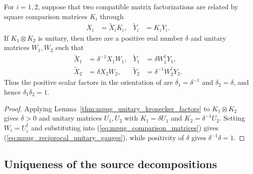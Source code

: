 \begin{lemma}
    \label{thm:mpug_reciprocal_unitary_gauges}
    \leanok
    For $i=1,2$, suppose that two compatible matrix factorizations are related
    by square comparison matrices $K_i$ through
    \begin{align}
        X_i & =\widetilde X_iK_i, & \widetilde Y_i & =K_iY_i.
        \label{eq:mpug_comparison_matrices}
    \end{align}
    If $K_1\otimes K_2$ is unitary, then there are a positive real number
    $\delta$ and unitary matrices $W_1,W_2$ such that
    \begin{align}
        \widetilde X_1 & =\delta^{-1}X_1W_1,          &
        \widetilde Y_1 & =\delta W_1^\dagger Y_1,       \\
        \widetilde X_2 & =\delta X_2W_2,              &
        \widetilde Y_2 & =\delta^{-1}W_2^\dagger Y_2.
        \label{eq:mpug_reciprocal_unitary_gauges}
    \end{align}
    Thus the positive scalar factors in the orientation of
    \cite[Lemma at lines~1052--1066]{FrancoRubio2025MPUGauging} are
    $\delta_1=\delta^{-1}$ and $\delta_2=\delta$, and hence
    $\delta_1\delta_2=1$.
\end{lemma}

\begin{proof}\leanok
    Applying Lemma~\ref{thm:mpug_unitary_kronecker_factors} to
    $K_1\otimes K_2$ gives $\delta>0$ and unitary matrices $U_1,U_2$ with
    $K_1=\delta U_1$ and $K_2=\delta^{-1}U_2$. Setting
    $W_i=U_i^\dagger$ and substituting into
    (\ref{eq:mpug_comparison_matrices}) gives
    (\ref{eq:mpug_reciprocal_unitary_gauges}), while positivity of $\delta$
    gives $\delta^{-1}\delta=1$.
\end{proof}

\subsection{Uniqueness of the source decompositions}

